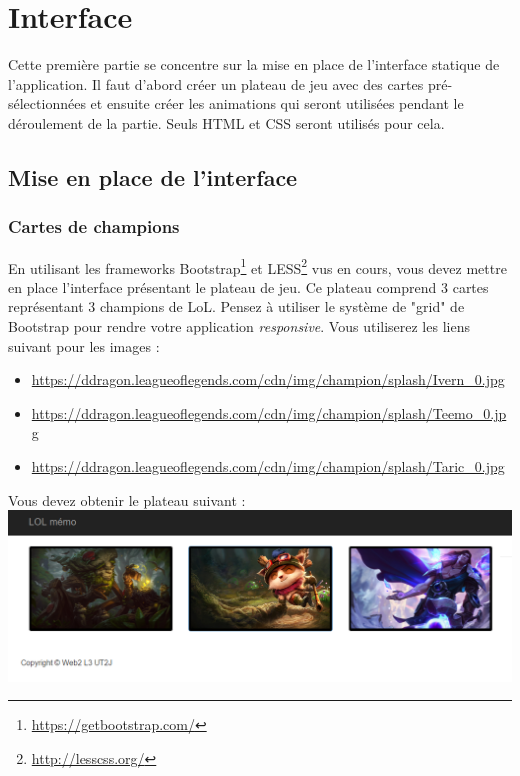 \documentclass[a4paper,11pt]{article}
\theoremstyle{mytheor}
\begin{document}
\section{Interface}
Cette première partie se concentre sur la mise en place de l'interface statique de l'application. Il faut d'abord créer un plateau de jeu avec des cartes pré-sélectionnées et ensuite créer les animations qui seront utilisées pendant le déroulement de la partie. Seuls HTML et CSS seront utilisés pour cela. 

\subsection{Mise en place de l'interface}
\subsubsection{Cartes de champions}
En utilisant les frameworks Bootstrap\footnote{\url{https://getbootstrap.com/}} et LESS\footnote{\url{http://lesscss.org/}} vus en cours, vous devez mettre en place l'interface présentant le plateau de jeu. Ce plateau comprend 3 cartes représentant 3 champions de LoL. Pensez à utiliser le système de "grid" de Bootstrap pour rendre votre application \textit{responsive}. Vous utiliserez les liens suivant pour les images : 
\small
\begin{itemize}
    \item \url{https://ddragon.leagueoflegends.com/cdn/img/champion/splash/Ivern_0.jpg}
    \item \url{https://ddragon.leagueoflegends.com/cdn/img/champion/splash/Teemo_0.jpg}
    \item \url{https://ddragon.leagueoflegends.com/cdn/img/champion/splash/Taric_0.jpg}
\end{itemize}
\normalsize
Vous devez obtenir le plateau suivant : \\
\includegraphics[width=\textwidth]{img/plateau.png}
\end{document}
